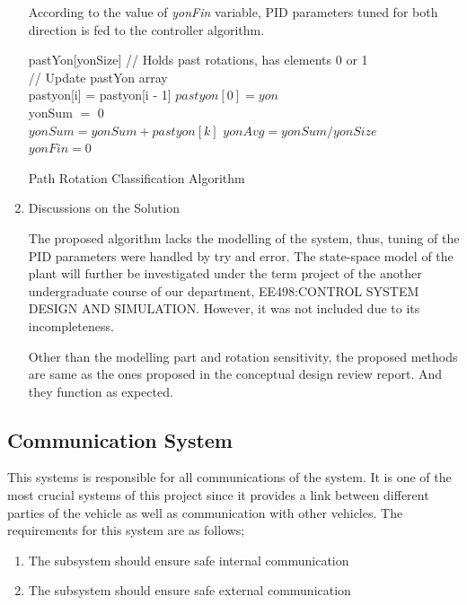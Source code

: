 \documentclass[a4paper,12pt]{article}
\begin{document}
\begin{enumerate}
	According to the value of \textit{yonFin} variable, PID parameters tuned for both direction is fed to the controller algorithm.
	
	\begin{algorithm}
		\DontPrintSemicolon	
		pastYon[yonSize] // Holds past rotations, has elements 0 or 1 \\
		// Update pastYon array \\ 
		 {
			pastyon[i] = pastyon[i - 1]
		}
		$ pastyon[0]=yon $\\
		yonSum $=$ 0 \\
		{
			$ yonSum = yonSum + pastyon[k] $
		}
		$ yonAvg=yonSum/yonSize $\\ 
		 {
			$yonFin=0$ 
		}   
		\caption{Path Rotation Classification Algorithm}
		\label{algo:rotation}
	\end{algorithm}
	
	\item {Discussions on the Solution}
	
	The proposed algorithm lacks the modelling of the system, thus, tuning of the PID parameters were handled by try and error. The state-space model of the plant will further be investigated under the term project of the another undergraduate course of our department, EE498:CONTROL SYSTEM DESIGN AND SIMULATION. However, it was not included due to its incompleteness.	
	
	Other than the modelling part and rotation sensitivity, the proposed methods are same as the ones proposed in the conceptual design review report. And they function as expected. 


\end{enumerate}


\subsection{Communication System}

	This systems is responsible for all communications of the system. It is one of the most crucial systems of this project since it provides a link between different parties of the vehicle as well as communication with other vehicles. The requirements for this system are as follows;		

	\begin{enumerate}
		\item The subsystem should ensure safe internal communication
		\item The subsystem should ensure safe external communication
	\end{enumerate}	
\end{document}
